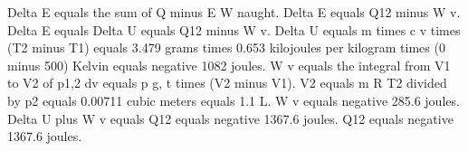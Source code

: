 Delta E equals the sum of Q minus E W naught.  
Delta E equals Q12 minus W v.  
Delta E equals Delta U equals Q12 minus W v.  
Delta U equals m times c v times (T2 minus T1)  
equals 3.479 grams times 0.653 kilojoules per kilogram times (0 minus 500) Kelvin  
equals negative 1082 joules.  
W v equals the integral from V1 to V2 of p1,2 dv equals p g, t times (V2 minus V1).  
V2 equals m R T2 divided by p2 equals 0.00711 cubic meters equals 1.1 L.  
W v equals negative 285.6 joules.  
Delta U plus W v equals Q12 equals negative 1367.6 joules.  
Q12 equals negative 1367.6 joules.